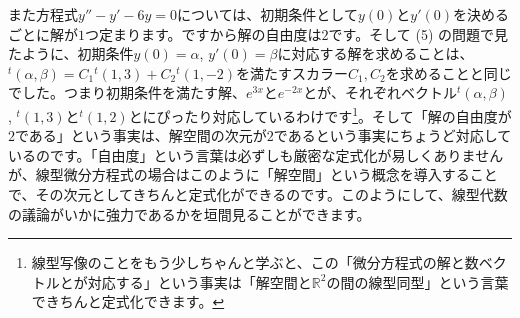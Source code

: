 また方程式$y'' - y' - 6y = 0$については、初期条件として$y(0)$と$y'(0)$を決めるごとに解が$1$つ定まります。ですから解の自由度は$2$です。そして (5) の問題で見たように、初期条件$y(0) = \alpha$, $y'(0) = \beta$に対応する解を求めることは、${}^t(\alpha, \beta) = C_1{}^t(1, 3) + C_2{}^t(1, -2)$を満たすスカラー$C_1, C_2$を求めることと同じでした。つまり初期条件を満たす解、$e^{3x}$と$e^{-2x}$とが、それぞれベクトル${}^t(\alpha, \beta)$, ${}^t (1,3)$と${}^t (1,2)$とにぴったり対応しているわけです\footnote{線型写像のことをもう少しちゃんと学ぶと、この「微分方程式の解と数ベクトルとが対応する」という事実は「解空間と$\mathbb{R}^2$の間の線型同型」という言葉できちんと定式化できます。}。そして「解の自由度が$2$である」という事実は、解空間の次元が$2$であるという事実にちょうど対応しているのです。「自由度」という言葉は必ずしも厳密な定式化が易しくありませんが、線型微分方程式の場合はこのように「解空間」という概念を導入することで、その次元としてきちんと定式化ができるのです。このようにして、線型代数の議論がいかに強力であるかを垣間見ることができます。

